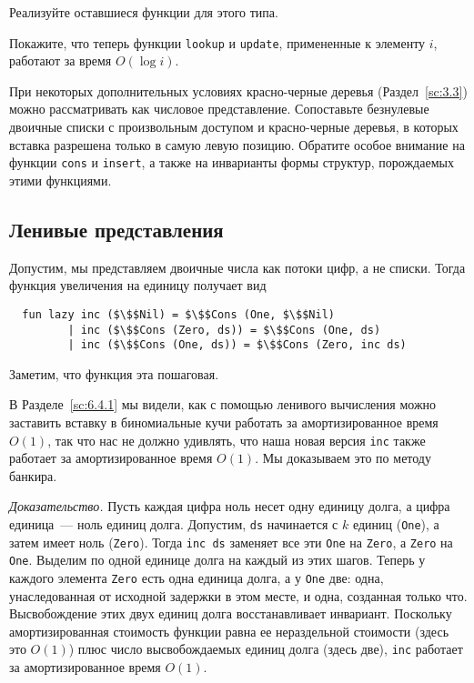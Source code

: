 \begin{exercise}\label{ex:9.5}
  Реализуйте оставшиеся функции для этого типа.
\end{exercise}

\begin{exercise}\label{ex:9.6}
  Покажите, что теперь функции \lstinline!lookup! и
  \lstinline!update!, примененные к элементу $i$, работают за время
  $O(\log i)$.
\end{exercise}

\begin{exercise}\label{ex:9.7}
  При некоторых дополнительных условиях красно-черные деревья
  (Раздел~\ref{sc:3.3}) можно рассматривать как числовое
  представление. Сопоставьте безнулевые двоичные списки с произвольным
  доступом и красно-черные деревья, в которых вставка разрешена только
  в самую левую позицию. Обратите особое внимание на функции
  \lstinline!cons! и \lstinline!insert!, а также на инварианты формы
  структур, порождаемых этими функциями.
\end{exercise}

\subsection{Ленивые представления}
\label{sc:9.2.3}

Допустим, мы представляем двоичные числа как потоки цифр, а не
списки. Тогда функция увеличения на единицу получает вид
\begin{lstlisting}
  fun lazy inc ($\$$Nil) = $\$$Cons (One, $\$$Nil)
         | inc ($\$$Cons (Zero, ds)) = $\$$Cons (One, ds)
         | inc ($\$$Cons (One, ds)) = $\$$Cons (Zero, inc ds)
\end{lstlisting}
Заметим, что функция эта пошаговая.

В Разделе~\ref{sc:6.4.1} мы видели, как с помощью ленивого вычисления
можно заставить вставку в биномиальные кучи работать за
амортизированное время $O(1)$, так что нас не должно удивлять, что
наша новая версия \lstinline!inc! также работает за амортизированное
время $O(1)$. Мы доказываем это по методу банкира.

\emph{Доказательство.} Пусть каждая цифра ноль несет одну единицу долга, а
цифра единица~--- ноль единиц долга. Допустим, \lstinline!ds!
начинается с $k$ единиц (\lstinline!One!), а затем имеет ноль
(\lstinline!Zero!). Тогда \lstinline!inc ds! заменяет все эти \lstinline!One!
на \lstinline!Zero!, а \lstinline!Zero! на \lstinline!One!. 
Выделим по одной единице долга на каждый
из этих шагов. Теперь у каждого элемента \lstinline!Zero! есть одна
единица долга, а у \lstinline!One! две: одна, унаследованная от
исходной задержки в этом месте, и одна, созданная только
что. Высвобождение этих двух единиц долга восстанавливает
инвариант. Поскольку амортизированная стоимость функции равна ее
нераздельной стоимости (здесь это $O(1)$) плюс число высвобождаемых
единиц долга (здесь две), \lstinline!inc! работает за амортизированное
время $O(1)$.

 
